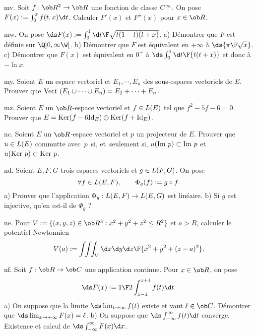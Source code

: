 \exo [Level=2,Fight=1,Learn=2,Type=\Exercices,Field=\FonctionsDéfiniesParUneIntégrale,Origin=] mv. 
Soit $f:\ob R^2\to\ob R$ une fonction de classe $\sc C^\infty$. 
On pose $F(x):=\int_0^xf(t,x)\d t$. \pn
Calculer $F'(x)$ et $F''(x)$ pour $x\in\ob R$. 
 
\exo [Level=2,Fight=2,Learn=2,Type=\Exercices,Field=\FonctionsDéfiniesParUneIntégrale,Origin=] mw. 
On pose $\ds F(x):=\int_0^1{\d t\F\sqrt{t(1-t)(t+x)}}$. \pn
a) Démontrer que $F$ est définie sur $\Q]0,\infty\W[$. \pn
b) Démontrer que $F$ est équivalent en $+\infty$ à $\ds{\pi\F\sqrt x}$. \pn
c) Démontrer que $F(x)$ est équivalent en $0^+$ à $\ds \int_0^1{\d t\F{t(t+x)}}$ et donc à $-\ln x$. 


\exo [Origin=,Level=1,Fight=1,Learn=1,Type=\Cours,Field=\EspacesVectoriels] my. 
Soient $E$ un espace vectoriel et  
$E_1,\cdots, E_n$ des sous-espaces vectoriels de $E$. \pn
Prouver que $\hbox{\rm Vect\ }(E_1\cup\cdots\cup E_n)
=E_1+\cdots+E_n$. 

\exo [Origin=,Level=1,Fight=2,Learn=1,Type=\Exercices,Field=\EspacesVectoriels] mz. 
Soient $E$ un $\ob R$-espace vectoriel et $f\in\sc L(E)$ tel que $f^2-5f-6=0$. \pn
Prouver que $E=\hbox{\rm Ker}(f-6\hbox{\rm Id}_E)\oplus\hbox{\rm Ker}(f+\hbox{\rm Id}_E)$. 



\exo [Level=1,Fight=1,Learn=1,Type=\Exercices,Field=\EspacesVectoriels,Origin=] nc. 
Soient $E$ un $\ob R$-espace vectoriel et $p$ un projecteur de $E$. 
Prouver que $u\in\sc L(E)$ commutte avec~$p$~si, et~seulement si, 
$u(\hbox{\rm Im\ }p)\subset\hbox{\rm Im\ }p$ et $u(\hbox{\rm Ker\ }p)\subset\hbox{\rm Ker\ }p$. 

\exo [Origin=,Level=1,Fight=3,Learn=2,Type=\Colles,Field=\EspacesVectoriels] nd. 
Soient $E,F,G$ trois espaces vectoriels et $g\in\sc L(F,G)$. On pose 
$$
\forall f\in\sc L(E,F), \qquad \Phi_g(f):=g\circ f.
$$ 
a) Prouver que l'application $\Phi_g:\sc L(E,F)\to\sc L(E,G)$ est linéaire. \pn
b) Si $g$ est injective, qu'en est-il de $\Phi_g$ ?

\exo [Level=2,Fight=1,Learn=1,Type=\Exercices,Field=\IntégralesMultiples,Origin=] ne. 
Pour $V:=\{(x,y,z)\in\ob R^3:x^2+y^2+z^2\le R^2\}$ et $a>R$,  
calculer le potentiel Newtonnien 
$$
V(a):=\int\!\!\int\!\!\int_V{\d x\d y\d z\F{x^2+y^2+(z-a)^2}}.
$$

\exo [Level=2,Fight=2,Learn=2,Type=\Exercices,Field=\FonctionsDéfiniesParUneIntégrale,Origin=] nf. 
Soit $f:\ob R\to\ob C$ une application continue. Pour $x\in\ob R$, 
on pose 
$$
\ds F(x):={1\F 2}\int_{x-1}^{x+1}f(t)\d t.
$$
a) On suppose que la limite $\ds\lim_{t\to\infty}f(t)$ existe et vaut $\ell\in\ob C$. Démontrer que 
$\ds\lim_{x\to+\infty}F(x)=\ell$. \pn
b) On suppose que $\ds\int_{-\infty}^{\infty}f(t)\d t$ converge. Existence et calcul de 
$\ds\int_{-\infty}^{\infty}F(x)\d x$. 

